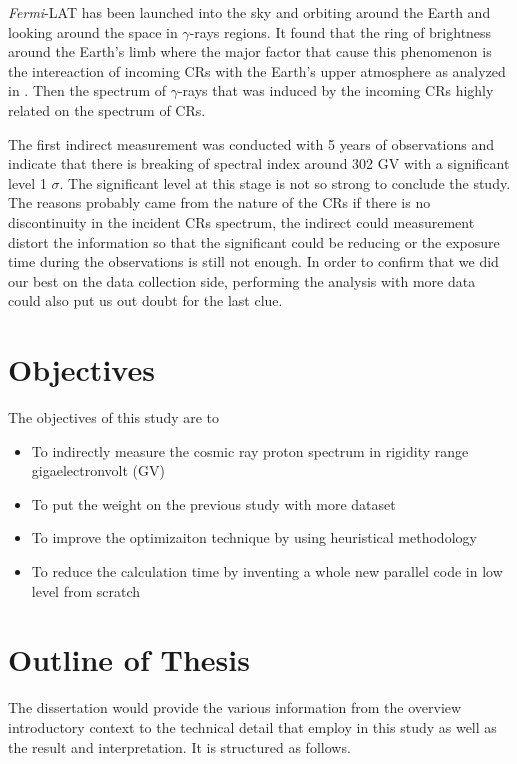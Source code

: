 \textit{Fermi}-LAT has been launched into the sky and orbiting around the
Earth and looking around the space in $\gamma$-rays regions.
It found that the ring of brightness around the Earth's limb where 
the major factor that cause this phenomenon is the intereaction of 
incoming CRs with the Earth's upper atmosphere as analyzed in \cite{FermiEarth09}.
Then the spectrum of $\gamma$-rays that was induced by the incoming 
CRs highly related on the spectrum of CRs.


The first indirect measurement was conducted with 5 years of
observations and indicate that there is breaking of spectral
index around 302 GV with a significant level 1 $\sigma$.
The significant level at this stage is not so strong to conclude the 
study. The reasons probably came from the nature of the CRs if there 
is no discontinuity in the incident CRs spectrum, the indirect could 
measurement distort the information so that the significant could be reducing
or the exposure time during the observations is still not enough.
In order to confirm that we did our best on the data
collection side, performing the analysis with more data could also 
put us out doubt for the last clue.


\section{Objectives}
The objectives of this study are to 
\begin{itemize}
    \item To indirectly measure the cosmic ray proton spectrum in rigidity range gigaelectronvolt (GV)
    \item To put the weight on the previous study with more dataset
    \item To improve the optimizaiton technique by using heuristical methodology
    \item To reduce the calculation time by inventing a whole new
    parallel code in low level from scratch
\end{itemize}


\section{Outline of Thesis}
The dissertation would provide the various information from the 
overview introductory context to the technical detail that employ 
in this study as well as the result and interpretation. It is 
structured as follows.

